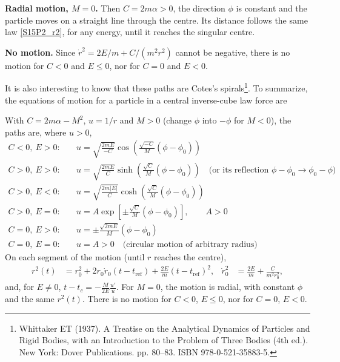 \begin{problem}[title={Motion in an inverse-cube attractive force}]
{\vspace{2ex}\textbf{Radial motion, $M=0$.} Then $C = 2m\alpha>0$, the direction $\phi$ is constant and the particle moves on a straight line through the centre. Its distance follows the same law \eqref{S15P2_r2}, for any energy, until it reaches the singular centre.

\vspace{2ex}\textbf{No motion.} Since $\Dot{r}^2 = 2E/m + C/(m^2r^2)$ cannot be negative, there is no motion for $C<0$ and $E\leq0$, nor for $C=0$ and $E<0$.

It is also interesting to know that these paths are Cotes's spirals\footnote{Whittaker ET (1937). A Treatise on the Analytical Dynamics of Particles and Rigid Bodies, with an Introduction to the Problem of Three Bodies (4th ed.). New York: Dover Publications. pp. 80–83. ISBN 978-0-521-35883-5.}. To summarize, the equations of motion for a particle in a central inverse-cube law force are
}
{
With $C = 2m\alpha - M^2$, $u = 1/r$ and $M>0$ (change $\phi$ into $-\phi$ for $M<0$), the paths are, where $u>0$,
\begin{align*}
    C<0,\ E>0: &\quad u = \sqrt{\frac{2mE}{-C}}\cos{\left(\frac{\sqrt{-C}}{M}(\phi-\phi_0)\right)} \\
    C>0,\ E>0: &\quad u = \sqrt{\frac{2mE}{C}}\sinh{\left(\frac{\sqrt{C}}{M}(\phi-\phi_0)\right)} \quad \text{(or its reflection } \phi-\phi_0 \rightarrow \phi_0-\phi\text{)} \\
    C>0,\ E<0: &\quad u = \sqrt{\frac{2m|E|}{C}}\cosh{\left(\frac{\sqrt{C}}{M}(\phi-\phi_0)\right)} \\
    C>0,\ E=0: &\quad u = A\exp{\left[\pm\frac{\sqrt{C}}{M}(\phi-\phi_0)\right]}, \qquad A>0 \\
    C=0,\ E>0: &\quad u = \pm\frac{\sqrt{2mE}}{M}(\phi-\phi_0) \\
    C=0,\ E=0: &\quad u = A>0 \quad \text{(circular motion of arbitrary radius)}
\end{align*}
On each segment of the motion (until $r$ reaches the centre),
\begin{align*}
    r^2(t) &= r_0^2 + 2r_0\Dot{r}_0(t-t_{\text{ref}}) + \frac{2E}{m}(t-t_{\text{ref}})^2, &
    \Dot{r}_0^2 &= \frac{2E}{m} + \frac{C}{m^2r_0^2},
\end{align*}
and, for $E\neq0$, $t - t_c = -\frac{M}{2E}\frac{u'}{u}$. For $M=0$, the motion is radial, with constant $\phi$ and the same $r^2(t)$. There is no motion for $C<0$, $E\leq0$, nor for $C=0$, $E<0$.
}
\end{problem}

